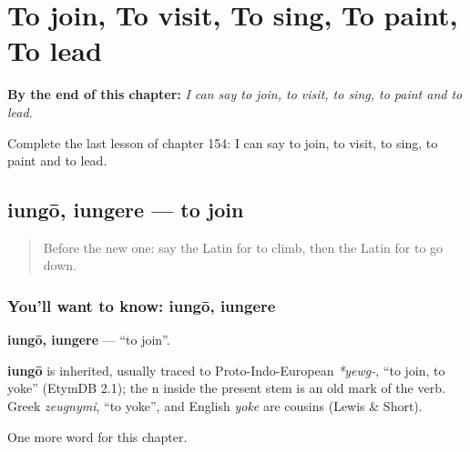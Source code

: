 
\chapter{To join, To visit, To sing, To paint, To lead}
\label{ch:la-to-join-to-visit-to-sing-to-paint-to-lead}

\begin{chapteropening}
\textbf{By the end of this chapter:} \emph{I can say to join, to visit, to sing, to paint and to lead.}

Complete the last lesson of chapter 154: I can say to join, to visit, to sing, to paint and to lead.
\end{chapteropening}

\section[iungō, iungere]{iungō, iungere — to join}

\label{lesson:LA-C154-iungo}



\begin{quote}
Before the new one: say the Latin for to climb, then the Latin for to go down.
\end{quote}

\subsection*{You'll want to know: iungō, iungere}
\textbf{iungō, iungere} — \textquotedblleft{}to join\textquotedblright{}.

\begin{cousinweb}
\textbf{iungō} is inherited, usually traced to Proto-Indo-European \emph{*yewg-}, \textquotedblleft{}to join, to yoke\textquotedblright{} (EtymDB 2.1); the n inside the present stem is an old mark of the verb. Greek \emph{zeugnymi}, \textquotedblleft{}to yoke\textquotedblright{}, and English \emph{yoke} are cousins (Lewis \& Short).
\end{cousinweb}

\begin{grammarlens}[title={What you've built}]
One more word for this chapter.
\end{grammarlens}

